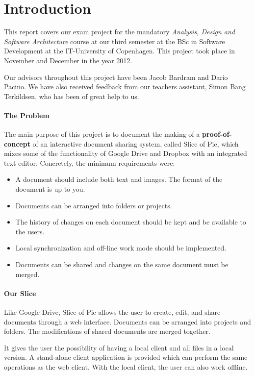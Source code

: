 \section{Introduction}
This report covers our exam project for the mandatory \emph{Analysis, Design and Software Architecture}
course at our third semester at the BSc in Software Development at the IT-University of Copenhagen.
This project took place in November and December in the year 2012. 

Our advisors throughout this project have been Jacob Bardram and Dario Pacino. We have also received feedback from
our teachers assistant, Simon Bang Terkildsen, who has been of great help to us.

\paragraph{The Problem}
The main purpose of this project is to document the making of a \textbf{proof-of-concept} of an interactive document
sharing system, called Slice of Pie, which mixes some of the functionality of Google Drive and Dropbox with
an integrated text editor.
Concretely, the minimum requirements were:
\begin{itemize}
\item A document should include both text and images. The format of the document is up to you.
\item Documents can be arranged into folders or projects.
\item The history of changes on each document should be kept and be available to the users.
\item Local synchronization and off-line work mode should be implemented.
\item Documents can be shared and changes on the same document must be merged.
\end{itemize}
\paragraph{Our Slice}
Like Google Drive, Slice of Pie allows the user to create, edit, and share documents through a web interface.
Documents can be arranged into projects and folders. The modifications of shared documents are merged together.

It gives the user the possibility of having a local client and all files in a local version. A stand-alone client
application is provided which can perform the same operations as the web client. With the local client, the user
can also work offline.

